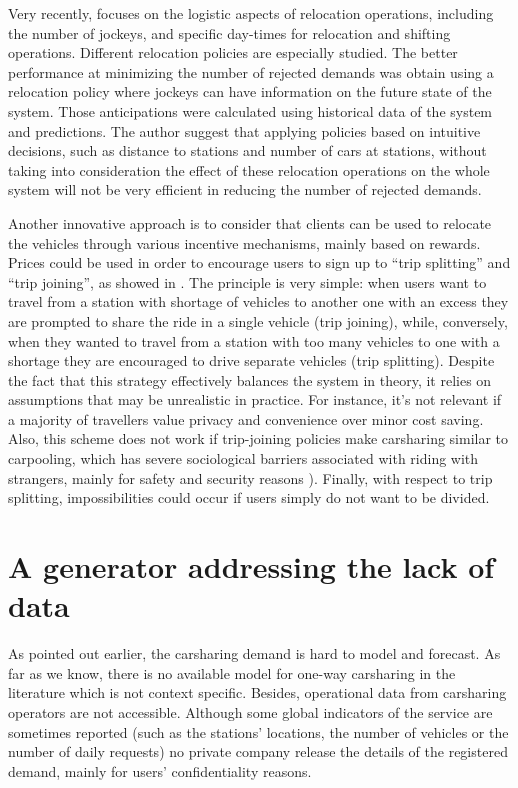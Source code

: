 \begin{bibunit}[ieeetr]
\medskip
Very recently, \cite{zakaria_optimization_2015} focuses on the logistic aspects of relocation operations, including the number of jockeys, and specific day-times for relocation and shifting operations.
Different relocation policies are especially studied.
The better performance at minimizing the number of rejected demands was obtain using a relocation policy where jockeys can have information on the future state of the system.
Those anticipations were calculated using historical data of the system and predictions. %
The author suggest that applying policies based on intuitive decisions, such as distance to stations and number of cars at stations, without taking into consideration the effect of these relocation operations on the whole system will not be very efficient in reducing the number of rejected demands.

\medskip
Another innovative approach is to consider that clients can be used to relocate the vehicles through various incentive mechanisms, mainly based on rewards.
Prices could be used in order to encourage users to sign up to ``trip splitting'' and ``trip joining'', as showed in \cite{barth_user_based_2004}.
The principle is very simple: when users want to travel from a station with shortage of vehicles to another one with an excess they are prompted to share the ride in a single vehicle (trip joining), while, conversely, when they wanted to travel from a station with too many vehicles to one with a shortage they are encouraged to drive separate vehicles (trip splitting).
Despite the fact that this strategy effectively balances the system in theory, it relies on assumptions that may be unrealistic in practice.
For instance, it's not relevant if a majority of travellers value privacy and convenience over minor cost saving.
Also, this scheme does not work if trip-joining policies make carsharing similar to carpooling, which has severe sociological barriers associated with riding with strangers, mainly for safety and security reasons \cite{chan_ridesharing_2012, correia_carpooling_2011}).
Finally, with respect to trip splitting, impossibilities could occur if users simply do not want to be divided.


\section{A generator addressing the lack of data}

As pointed out earlier, the carsharing demand is hard to model and forecast.
As far as we know, there is no available model for one-way carsharing in the literature which is not context specific.
Besides, operational data from carsharing operators are not accessible.
Although some global indicators of the service are sometimes reported (such as the stations' locations, the number of vehicles or the number of daily requests) no private company release the details of the registered demand, mainly for users' confidentiality reasons.


\end{bibunit}

